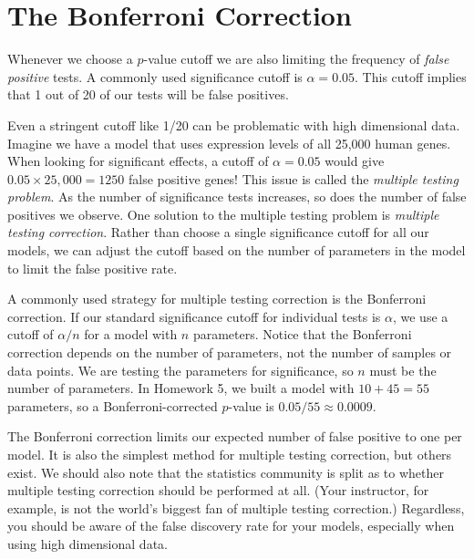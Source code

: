\documentclass[pal,12pt]{pajarticle}
\begin{document}
\thispagestyle{empty}

\section*{The Bonferroni Correction}

Whenever we choose a $p$-value cutoff we are also limiting the frequency of \emph{false positive} tests. A commonly used significance cutoff is $\alpha = 0.05$. This cutoff implies that 1 out of 20 of our tests will be false positives. 

Even a stringent cutoff like 1/20 can be problematic with high dimensional data. Imagine we have a model that uses expression levels of all 25,000 human genes. When looking for significant effects, a cutoff of $\alpha=0.05$ would give $0.05\times 25,000 = 1250$ false positive genes! This issue is called the \emph{multiple testing problem}. As the number of significance tests increases, so does the number of false positives we observe. One solution to the multiple testing problem is \emph{multiple testing correction}. Rather than choose a single significance cutoff for all our models, we can adjust the cutoff based on the number of parameters in the model to limit the false positive rate.

A commonly used strategy for multiple testing correction is the Bonferroni correction. If our standard significance cutoff for individual tests is $\alpha$, we use a cutoff of $\alpha/n$ for a model with $n$ parameters. Notice that the Bonferroni correction depends on the number of parameters, not the number of samples or data points. We are testing the parameters for significance, so $n$ must be the number of parameters. In Homework 5, we built a model with $10 + 45=55$ parameters, so a Bonferroni-corrected $p$-value is $0.05/55\approx0.0009$.


The Bonferroni correction limits our expected number of false positive to one per model. It is also the simplest method for multiple testing correction, but others exist. We should also note that the statistics community is split as to whether multiple testing correction should be performed at all. (Your instructor, for example, is not the world's biggest fan of multiple testing correction.) Regardless, you should be aware of the false discovery rate for your models, especially when using high dimensional data.
\end{document}
